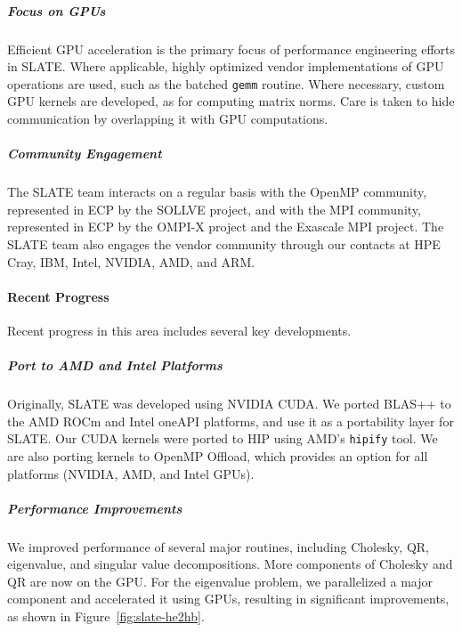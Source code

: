 \subparagraph{Focus on GPUs}
Efficient GPU acceleration is the primary focus of performance
engineering efforts in SLATE.
Where applicable, highly optimized vendor implementations of GPU operations
are used, such as the batched \texttt{gemm} routine.
Where necessary, custom GPU kernels are developed, as for computing
matrix norms.
Care is taken to hide communication by overlapping it with GPU computations.

\subparagraph{Community Engagement}
The SLATE team interacts on a regular basis with the OpenMP community,
represented in ECP by the SOLLVE project, and with the MPI community,
represented in ECP by the OMPI-X project and the Exascale MPI project.
The SLATE team also engages the vendor community through our contacts
at HPE Cray, IBM, Intel, NVIDIA, AMD, and ARM.

\paragraph{Recent Progress}
Recent progress in this area includes several key developments.


\subparagraph{Port to AMD and Intel Platforms}
Originally, SLATE was developed using NVIDIA CUDA. We ported BLAS++ to
the AMD ROCm and Intel oneAPI platforms, and use it as a portability
layer for SLATE. Our CUDA kernels were ported to HIP using
AMD's \texttt{hipify} tool. We are also porting kernels to OpenMP
Offload, which provides an option for all platforms (NVIDIA, AMD, and
Intel GPUs).

\subparagraph{Performance Improvements}
We improved performance of several major routines, including
Cholesky, QR, eigenvalue, and singular value decompositions. More components
of Cholesky and QR are now on the GPU. For the eigenvalue
problem, we parallelized a major component and accelerated it using
GPUs, resulting in significant improvements, as shown in
Figure~\ref{fig:slate-he2hb}.

